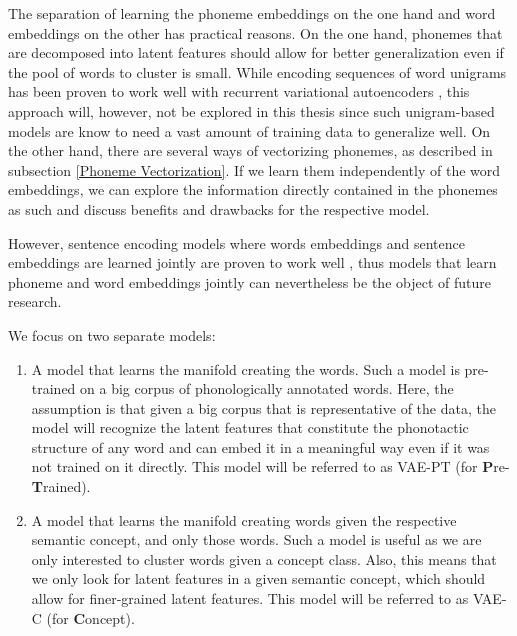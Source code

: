 \documentclass[6pt]{article}
\begin{document}
The separation of learning the phoneme embeddings on the one hand and word embeddings on the other has practical reasons. On the one hand, phonemes that are decomposed into latent features should allow for better generalization even if the pool of words to cluster is small. While encoding sequences of word unigrams has been proven to work well with recurrent variational autoencoders \citep{bowman2015generating}, this approach will, however, not be explored in this thesis since such unigram-based models are know to need a vast amount of training data to generalize well. On the other hand, there are several ways of vectorizing phonemes, as described in subsection \ref{Phoneme Vectorization}. If we learn them independently of the word embeddings, we can explore the information directly contained in the phonemes as such and discuss benefits and drawbacks for the respective model.

However, sentence encoding models where words embeddings and sentence embeddings are learned jointly are proven to work well \cite{kiros2015skip}, thus models that learn phoneme and word embeddings jointly can nevertheless be the object of future research.


We focus on two separate models:
\begin{enumerate}
\item A model that learns the manifold creating the words. Such a model is pre-trained on a big corpus of phonologically annotated words. Here, the assumption is that given a big corpus that is representative of the data, the model will recognize the latent features that constitute the phonotactic structure of any word and can embed it in a meaningful way even if it was not trained on it directly. This model will be referred to as VAE-PT (for \textbf{P}re-\textbf{T}rained).
\item A model that learns the manifold creating words given the respective semantic concept, and only those words. Such a model is useful as we are only interested to cluster words given a concept class. Also, this means that we only look for latent features in a given semantic concept, which should allow for finer-grained latent features. This model will be referred to as VAE-C (for \textbf{C}oncept).
\end{enumerate}
\end{document}
